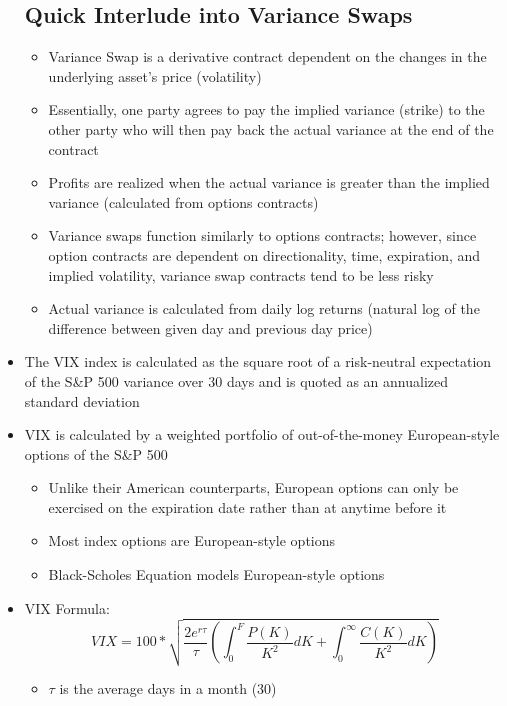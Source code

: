 \documentclass{article}
\begin{document}
\begin{itemize}
    \subsection*{Quick Interlude into Variance Swaps}
    \begin{itemize}
    \item Variance Swap is a derivative contract dependent on the changes in the underlying asset's price (volatility)
    \item Essentially, one party agrees to pay the implied variance (strike) to the other party who will then pay back the actual variance at the end of the contract
    \item Profits are realized when the actual variance is greater than the implied variance (calculated from options contracts)
    \item Variance swaps function similarly to options contracts; however, since option contracts are dependent on directionality, time, expiration, and implied volatility, variance swap contracts tend to be less risky
    \item Actual variance is calculated from daily log returns (natural log of the difference between given day and previous day price)
    \end{itemize}
    \item The VIX index is calculated as the square root of a risk-neutral expectation of the S\&P 500 variance over 30 days and is quoted as an annualized standard deviation
    \item VIX is calculated by a weighted portfolio of out-of-the-money European-style options of the S\&P 500
    \begin{itemize}
        \item Unlike their American counterparts, European options can only be exercised on the expiration date rather than at anytime before it
        \item Most index options are European-style options
        \item Black-Scholes Equation models European-style options
    \end{itemize} 
    \item VIX Formula:
    \begin{equation}
        VIX= 100 *\sqrt{\frac{2e^{r\tau}}{\tau}\left(\int_0^F \frac{P(K)}{K^2}dK + \int_0^\infty \frac{C(K)}{K^2}dK\right)}
    \end{equation}
    \begin{itemize}
        \item $\tau$ is the average days in a month (30)

\end{itemize}
\end{itemize}
\end{document}
